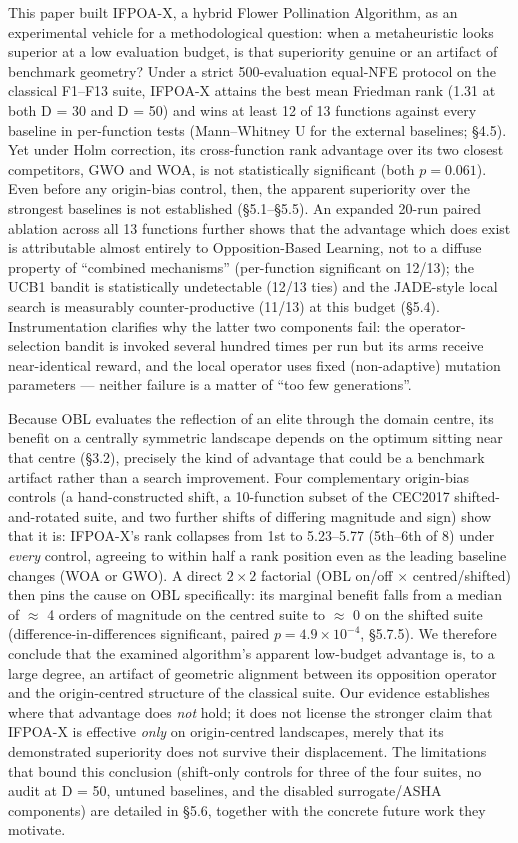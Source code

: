 \documentclass[preprint,12pt]{elsarticle}
\begin{document}
This paper built IFPOA-X, a hybrid Flower Pollination Algorithm, as an experimental vehicle for a methodological question: when a metaheuristic looks superior at a low evaluation budget, is that superiority genuine or an artifact of benchmark geometry? Under a strict 500-evaluation equal-NFE protocol on the classical F1--F13 suite, IFPOA-X attains the best mean Friedman rank (1.31 at both D = 30 and D = 50) and wins at least 12 of 13 functions against every baseline in per-function tests (Mann--Whitney U for the external baselines; \S4.5). Yet under Holm correction, its cross-function rank advantage over its two closest competitors, GWO and WOA, is not statistically significant (both $p = 0.061$). Even before any origin-bias control, then, the apparent superiority over the strongest baselines is not established (\S5.1--\S5.5). An expanded 20-run paired ablation across all 13 functions further shows that the advantage which does exist is attributable almost entirely to Opposition-Based Learning, not to a diffuse property of ``combined mechanisms'' (per-function significant on 12/13); the UCB1 bandit is statistically undetectable (12/13 ties) and the JADE-style local search is measurably counter-productive (11/13) at this budget (\S5.4). Instrumentation clarifies why the latter two components fail: the operator-selection bandit is invoked several hundred times per run but its arms receive near-identical reward, and the local operator uses fixed (non-adaptive) mutation parameters --- neither failure is a matter of ``too few generations''.

Because OBL evaluates the reflection of an elite through the domain centre, its benefit on a centrally symmetric landscape depends on the optimum sitting near that centre (\S3.2), precisely the kind of advantage that could be a benchmark artifact rather than a search improvement. Four complementary origin-bias controls (a hand-constructed shift, a 10-function subset of the CEC2017 shifted-and-rotated suite, and two further shifts of differing magnitude and sign) show that it is: IFPOA-X's rank collapses from 1st to 5.23--5.77 (5th--6th of 8) under \emph{every} control, agreeing to within half a rank position even as the leading baseline changes (WOA or GWO). A direct $2\times 2$ factorial (OBL on/off $\times$ centred/shifted) then pins the cause on OBL specifically: its marginal benefit falls from a median of $\approx$ 4 orders of magnitude on the centred suite to $\approx$ 0 on the shifted suite (difference-in-differences significant, paired $p = 4.9\times10^{-4}$, \S5.7.5). We therefore conclude that the examined algorithm's apparent low-budget advantage is, to a large degree, an artifact of geometric alignment between its opposition operator and the origin-centred structure of the classical suite. Our evidence establishes where that advantage does \emph{not} hold; it does not license the stronger claim that IFPOA-X is effective \emph{only} on origin-centred landscapes, merely that its demonstrated superiority does not survive their displacement. The limitations that bound this conclusion (shift-only controls for three of the four suites, no audit at D = 50, untuned baselines, and the disabled surrogate/ASHA components) are detailed in \S5.6, together with the concrete future work they motivate.
\end{document}
